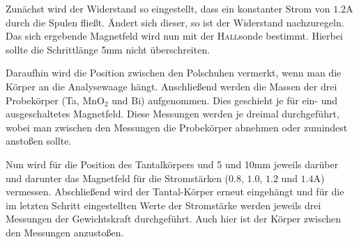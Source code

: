 \documentclass[12pt,a4paper,titlepage,headinclude,bibtotoc]{scrartcl}
\begin{document}
Zunächst wird der Widerstand so eingestellt, dass ein konstanter Strom von $1.2\si\ampere$ durch die Spulen fließt.
Ändert sich dieser, so ist der Widerstand nachzuregeln.
Das sich ergebende Magnetfeld wird nun mit der \textsc{Hall}sonde bestimmt.
Hierbei sollte die Schrittlänge 5mm nicht überschreiten.

Daraufhin wird die Position zwischen den Polschuhen vermerkt, wenn man die Körper an die Analysewaage hängt.
Anschließend werden die Massen der drei Probekörper (Ta, MnO$_2$ und Bi) aufgenommen.
Dies geschieht je für ein- und ausgeschaltetes Magnetfeld.
Diese Messungen werden je dreimal durchgeführt, wobei man zwischen den Messungen die Probekörper abnehmen oder zumindest anstoßen sollte.

Nun wird für die Position des Tantalkörpers und 5 und 10mm jeweils darüber und darunter das Magnetfeld für die Stromstärken ($0.8,\,1.0,\,1.2\text{ und }1.4\si\ampere$) vermessen.
Abschließend wird der Tantal-Körper erneut eingehängt und für die im letzten Schritt eingestellten Werte der Stromstärke werden jeweils drei Messungen der Gewichtskraft durchgeführt.
Auch hier ist der Körper zwischen den Messungen anzustoßen.
\end{document}
